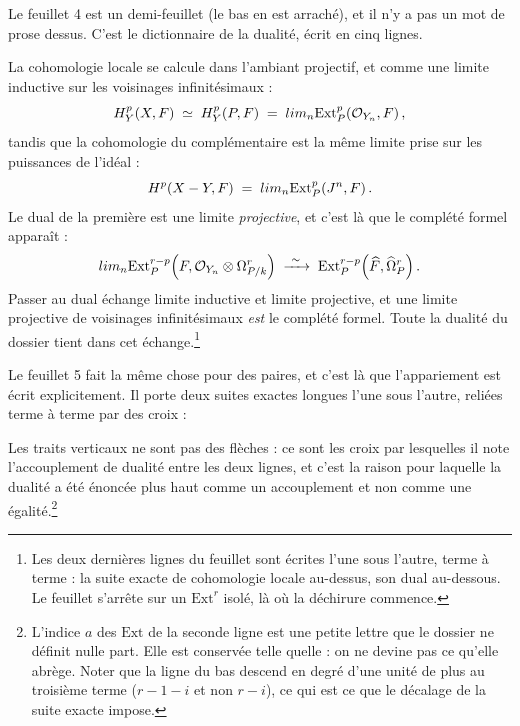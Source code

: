 \documentclass[11pt,a4paper]{article}
\begin{document}
Le feuillet 4 est un demi-feuillet (le bas en est arraché), et il n'y a pas
un mot de prose dessus. C'est le dictionnaire de la dualité, écrit en cinq
lignes.

La cohomologie locale se calcule dans l'ambiant projectif, et comme une limite
inductive sur les voisinages infinitésimaux :
\[
  H^{p}_{Y}(X, F) \;\simeq\; H^{p}_{Y}(P, F) \;=\;
  \varinjlim_{n} \mathrm{Ext}^{p}_{P}\!\left(\mathcal{O}_{Y_{n}}, F\right),
\]
tandis que la cohomologie du complémentaire est la même limite prise sur les
puissances de l'idéal :
\[
  H^{p}(X - Y, F) \;=\; \varinjlim_{n} \mathrm{Ext}^{p}_{P}\!\left(J^{n}, F\right).
\]
Le dual de la première est une limite \emph{projective}, et c'est là que le
complété formel apparaît :
\[
  \varprojlim_{n} \mathrm{Ext}^{r-p}_{P}\!\left(F,
  \mathcal{O}_{Y_{n}} \otimes \Omega^{r}_{P/k}\right)
  \;\xrightarrow{\ \sim\ }\;
  \mathrm{Ext}^{r-p}_{P}\!\left(\widehat{F}, \widehat{\Omega}^{r}_{P}\right).
\]
Passer au dual échange limite inductive et limite
projective, et une limite projective de voisinages infinitésimaux \emph{est}
le complété formel. Toute la dualité du
dossier tient dans cet échange.\footnote{Les deux dernières lignes du feuillet sont écrites l'une
sous l'autre, terme à terme : la suite exacte de cohomologie locale au-dessus,
son dual au-dessous. Le feuillet s'arrête sur un $\mathrm{Ext}^{r}$ isolé, là
où la déchirure commence.}

Le feuillet 5 fait la même chose pour des paires, et c'est là que
l'appariement est écrit explicitement. Il porte deux suites exactes longues
l'une sous l'autre, reliées terme à terme par des croix :


Les traits verticaux ne sont pas des flèches : ce sont les croix par lesquelles
il note l'accouplement de dualité entre les deux lignes, et c'est la raison
pour laquelle la dualité a été énoncée plus haut comme un accouplement et non
comme une égalité.\footnote{L'indice $a$ des $\mathrm{Ext}$ de la seconde ligne
est une petite lettre que le dossier ne définit nulle part. Elle est conservée
telle quelle : on ne devine pas ce qu'elle abrège. Noter que la ligne du bas
descend en degré d'une unité de plus au troisième terme ($r-1-i$ et non
$r-i$), ce qui est ce que le décalage de la suite exacte impose.}
\end{document}
